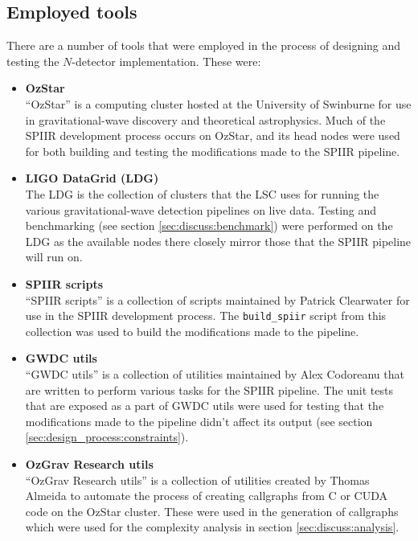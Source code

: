 \documentclass{article}
\begin{document}
\subsection{Employed tools} \label{sec:design_process:tools}

There are a number of tools that were employed in the process of designing and testing the \(N\)-detector implementation.
These were:
\begin{itemize}
    \item \textbf{OzStar \cite{ozstar}}\\
        ``OzStar'' is a computing cluster hosted at the University of Swinburne for use in gravitational-wave discovery and theoretical astrophysics.
        Much of the SPIIR development process occurs on OzStar, and its head nodes were used for both building and testing the modifications made to the SPIIR pipeline.
    \item \textbf{LIGO DataGrid (LDG) \cite{ldg}}\\
        The LDG is the collection of clusters that the LSC uses for running the various gravitational-wave detection pipelines on live data.
        Testing and benchmarking (see section \ref{sec:discuss:benchmark}) were performed on the LDG as the available nodes there closely mirror those that the SPIIR pipeline will run on.
    \item \textbf{SPIIR scripts \cite{build_spiir}}\\
        ``SPIIR scripts'' is a collection of scripts maintained by Patrick Clearwater for use in the SPIIR development process.
        The \texttt{build\_spiir} script from this collection was used to build the modifications made to the pipeline.
    \item \textbf{GWDC utils \cite{gwdc_utils}}\\
        ``GWDC utils'' is a collection of utilities maintained by Alex Codoreanu that are written to perform various tasks for the SPIIR pipeline.
        The unit tests that are exposed as a part of GWDC utils were used for testing that the modifications made to the pipeline didn't affect its output (see section \ref{sec:design_process:constraints}).
    \item \textbf{OzGrav Research utils \cite[\texttt{utils/}]{ozgrav_research}}\\
        ``OzGrav Research utils'' is a collection of utilities created by Thomas Almeida to automate the process of creating callgraphs from C or CUDA code on the OzStar cluster.
        These were used in the generation of callgraphs which were used for the complexity analysis in section \ref{sec:discuss:analysis}.
\end{itemize}
\end{document}

